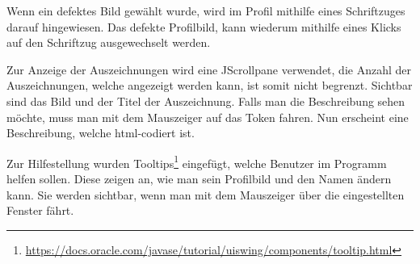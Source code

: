 Wenn ein defektes Bild gewählt wurde, wird im Profil mithilfe eines Schriftzuges darauf hingewiesen. Das defekte Profilbild, kann wiederum mithilfe eines Klicks auf den Schriftzug ausgewechselt werden.

Zur Anzeige der Auszeichnungen wird eine JScrollpane verwendet, die Anzahl der Auszeichnungen, welche angezeigt werden kann, ist somit nicht begrenzt. Sichtbar sind das Bild und der Titel der Auszeichnung. Falls man die Beschreibung sehen möchte, muss man mit dem Mauszeiger auf das Token fahren. Nun erscheint eine Beschreibung, welche html-codiert ist.

Zur Hilfestellung wurden Tooltips\footnote{\url{https://docs.oracle.com/javase/tutorial/uiswing/components/tooltip.html}} eingefügt, welche Benutzer im Programm helfen sollen. Diese zeigen an, wie man sein Profilbild und den Namen ändern kann. Sie werden sichtbar, wenn man mit dem Mauszeiger über die eingestellten Fenster fährt.